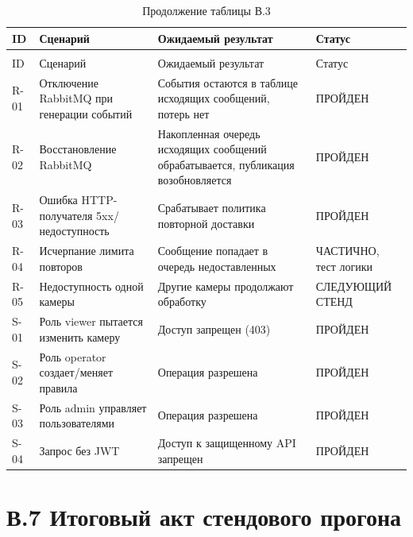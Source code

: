 \scriptsize
\begin{longtable}{@{}p{}p{}p{}p{}@{}}
\caption{Чек-лист надежности и безопасности}\\
\toprule
ID & Сценарий & Ожидаемый результат & Статус \\
\midrule
\endfirsthead
\caption*{Продолжение таблицы В.3}\\
\toprule
ID & Сценарий & Ожидаемый результат & Статус \\
\midrule
\endhead
R-01 & Отключение RabbitMQ при генерации событий & События остаются в таблице исходящих сообщений, потерь нет & ПРОЙДЕН \\
R-02 & Восстановление RabbitMQ & Накопленная очередь исходящих сообщений обрабатывается, публикация возобновляется & ПРОЙДЕН \\
R-03 & Ошибка HTTP-получателя 5xx/недоступность & Срабатывает политика повторной доставки & ПРОЙДЕН \\
R-04 & Исчерпание лимита повторов & Сообщение попадает в очередь недоставленных & ЧАСТИЧНО, тест логики \\
R-05 & Недоступность одной камеры & Другие камеры продолжают обработку & СЛЕДУЮЩИЙ СТЕНД \\
S-01 & Роль viewer пытается изменить камеру & Доступ запрещен (403) & ПРОЙДЕН \\
S-02 & Роль operator создает/меняет правила & Операция разрешена & ПРОЙДЕН \\
S-03 & Роль admin управляет пользователями & Операция разрешена & ПРОЙДЕН \\
S-04 & Запрос без JWT & Доступ к защищенному API запрещен & ПРОЙДЕН \\
\bottomrule
\end{longtable}
\normalsize

\section*{В.7 Итоговый акт стендового прогона}
{}

